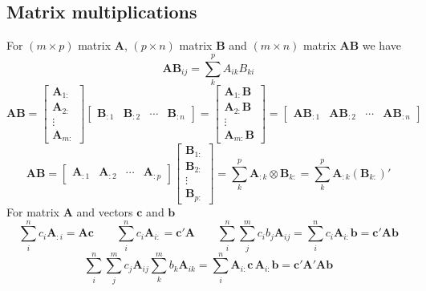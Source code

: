 \documentclass[a4paper]{article}
\newcommand{\vc}[1]{\mathbf{#1}}
\numberwithin{equation}{section}
\begin{document}
\subsection{Matrix multiplications}
For $(m \times p)$ matrix $\vc{A}$, $(p \times n)$ matrix $\vc{B}$ and $(m \times n)$ matrix $\vc{AB}$ we have
\begin{equation}
 \vc{AB}_{ij} = \sum_k^p A_{ik} B_{ki}
\end{equation}
\begin{equation}
\vc{AB} =
 \begin{bmatrix}
  \vc{A}_{1:} \\
  \vc{A}_{2:} \\
  \vdots \\
  \vc{A}_{m:}
 \end{bmatrix}
 \begin{bmatrix}
  \vc{B}_{:1} &
  \vc{B}_{:2} &
  \cdots &
  \vc{B}_{:n}  
 \end{bmatrix} =
 \begin{bmatrix}
  \vc{A}_{1:}\vc{B} \\
  \vc{A}_{2:}\vc{B} \\
  \vdots \\
  \vc{A}_{m:}\vc{B}
 \end{bmatrix} =
 \begin{bmatrix}
  \vc{A}\vc{B}_{:1} &
  \vc{A}\vc{B}_{:2} &
  \cdots &
  \vc{A}\vc{B}_{:n}  
 \end{bmatrix}
\end{equation}
\begin{equation}
 \vc{AB} =
 \begin{bmatrix}
  \vc{A}_{:1} &
  \vc{A}_{:2} &
  \cdots &
  \vc{A}_{:p}
 \end{bmatrix}
 \begin{bmatrix}
  \vc{B}_{1:} \\
  \vc{B}_{2:} \\
  \vdots \\
  \vc{B}_{p:}  
 \end{bmatrix} =
\sum_k^p \vc{A}_{:k} \otimes \vc{B}_{k:} = \sum_k^p \vc{A}_{:k} (\vc{B}_{k:})'
\end{equation}
For matrix $\vc{A}$ and vectors $\vc{c}$ and $\vc{b}$
\begin{equation}
 \sum_i^n c_i \vc{A}_{:i} = \vc{A} \vc{c} \qquad \sum_i^n c_i \vc{A}_{i:} = \vc{c}' \vc{A} \qquad
\sum_i^n \sum_j^m c_i b_j \vc{A}_{ij} = \sum_i^n c_i \vc{A}_{i:} \vc{b} =  \vc{c}' \vc{A} \vc{b}
\end{equation}
\begin{equation}
 \sum_i^n \sum_j^m c_j \vc{A}_{ij} \sum_k^m b_k \vc{A}_{ik} = \sum_i^n \vc{A}_{i:} \vc{c} \, \vc{A}_{i:} \vc{b} =  \vc{c}' \vc{A}' \vc{A} \vc{b}
\end{equation}
\end{document}
